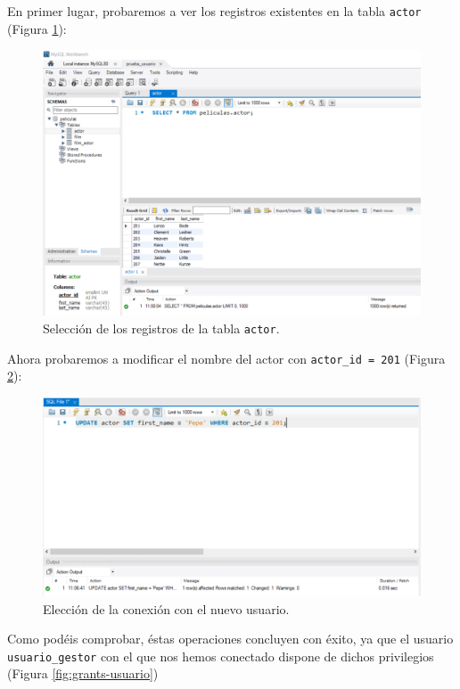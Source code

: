 \documentclass[a4paper]{article}
\begin{document}
En primer lugar, probaremos a ver los registros existentes en la tabla \texttt{actor} (Figura \ref{fig:select}):

\begin{figure}[H]
    \centering
    \includegraphics[width=\textwidth]{figs/gestion-usuarios/select_usr.PNG}
    \caption{Selección de los registros de la tabla \texttt{actor}.}
    \label{fig:select}
\end{figure}

Ahora probaremos a modificar el nombre del actor con \texttt{actor\_id = 201} (Figura \ref{fig:update}):

\begin{figure}[H]
    \centering
    \includegraphics[width=\textwidth]{figs/gestion-usuarios/update_usr.PNG}
    \caption{Elección de la conexión con el nuevo usuario.}
    \label{fig:update}
\end{figure}

Como podéis comprobar, éstas operaciones concluyen con éxito, ya que el usuario \texttt{usuario\_gestor} con el que nos hemos conectado dispone de dichos privilegios (Figura \ref{fig:grants-usuario})
\end{document}
